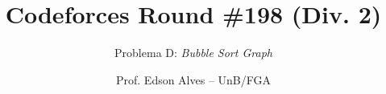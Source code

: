 \title{Codeforces Round \#198 (Div. 2)}
\subtitle{Problema D: \textit{Bubble Sort Graph}}
\author{Prof. Edson Alves -- UnB/FGA}
\date{}
